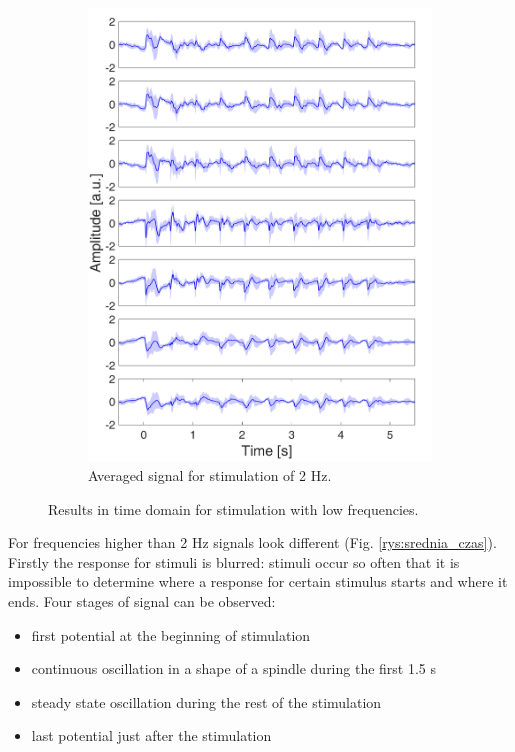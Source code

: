 \documentclass{pracalicmgr}
\begin{document}
\begin{figure}[H]
\begin{subfigure}{.5\textwidth}
		\includegraphics[width=1.\linewidth]{srednie_2Hz_5s.png}
		\caption{Averaged signal for stimulation of 2 Hz.}
		\label{rys:srednie_2Hz}
	\end{subfigure}
	\caption{Results in time domain for stimulation with low frequencies.}
	\label{rys:srednie_1_2}
	\end{figure}
    
    For frequencies higher than 2 Hz signals look different (Fig. \ref{rys:srednia_czas}). Firstly the response for stimuli is blurred: stimuli occur so often that it is impossible to determine where a response for certain stimulus starts and where it ends. 
    Four stages of signal can be observed: 
    \begin{itemize}[itemsep=1\itemsep,parsep=1\parsep,partopsep=0pt,topsep=0pt]
    	\item first potential at the beginning of stimulation
    	\item continuous oscillation in a shape of a spindle during the first 1.5 s
    	\item steady state oscillation during the rest of the stimulation
    	\item last potential just after the stimulation
	\end{itemize}
\end{document}
